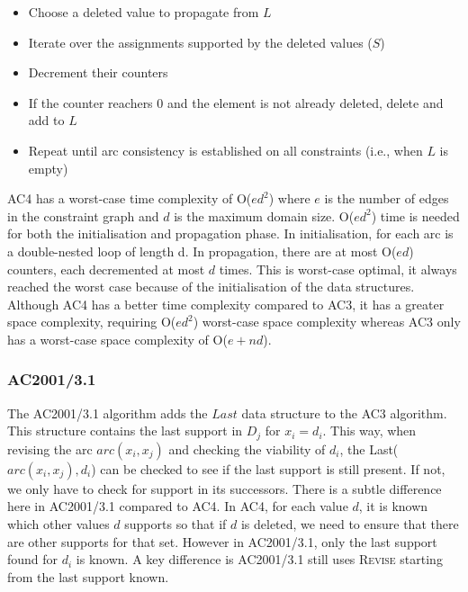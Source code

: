 \documentclass[CS4402-Notes.tex]{subfiles}
\begin{document}
\begin{itemize}
\item Choose a deleted value to propagate from $L$
\item Iterate over the assignments supported by the deleted values ($S$)
\item Decrement their counters
\item If the counter reachers 0 and the element is not already deleted, delete and add to $L$
\item Repeat until arc consistency is established on all constraints (i.e., when $L$ is empty)
\end{itemize}
AC4 has a worst-case time complexity of O($ed^2$) where $e$ is the number of edges in the constraint graph and $d$ is the maximum domain size. O($ed^2$) time is needed for both the initialisation and propagation phase. In initialisation, for each arc is a double-nested loop of length d. In propagation, there are at most O($ed$) counters, each decremented at most $d$ times. This is worst-case optimal, it always reached the worst case because of the initialisation of the data structures. 
\n
Although AC4 has a better time complexity compared to AC3, it has a greater space complexity, requiring O($ed^2$) worst-case space complexity whereas AC3 only has a worst-case space complexity of O($e + nd$).

\subsubsection{AC2001/3.1}
The AC2001/3.1 algorithm adds the $Last$ data structure to the AC3 algorithm. This structure contains the last support in $D_j$ for $x_i = d_i$. This way, when revising the arc $arc(x_i, x_j)$ and checking the viability of $d_i$, the Last($arc(x_i, x_j), d_i$) can be checked to see if the last support is still present. If not, we only have to check for support in its successors.
\n
There is a subtle difference here in AC2001/3.1 compared to AC4. In AC4, for each value $d$, it is known which other values $d$ supports so that if $d$ is deleted, we need to ensure that there are other supports for that set. However in AC2001/3.1, only the last support found for $d_i$ is known. A key difference is AC2001/3.1 still uses \textsc{Revise} starting from the last support known.
\end{document}
